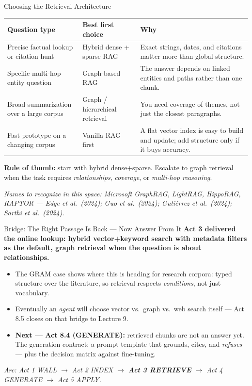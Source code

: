 \begin{frame}{Choosing the Retrieval Architecture}
\begin{center}
\renewcommand{\arraystretch}{1.15}
\small
\begin{tabular}{|p{3.2cm}|p{3.1cm}|p{5.8cm}|}
\hline
\textbf{Question type} & \textbf{Best first choice} & \textbf{Why} \\
\hline
Precise factual lookup or citation hunt & Hybrid dense + sparse RAG & Exact strings, dates, and citations matter more than global structure. \\
\hline
Specific multi-hop entity question & Graph-based RAG & The answer depends on linked entities and paths rather than one chunk. \\
\hline
Broad summarization over a large corpus & Graph / hierarchical retrieval & You need coverage of themes, not just the closest paragraphs. \\
\hline
Fast prototype on a changing corpus & Vanilla RAG first & A flat vector index is easy to build and update; add structure only if it buys accuracy. \\
\hline
\end{tabular}
\end{center}

\medskip
\textbf{Rule of thumb:} start with hybrid dense+sparse. Escalate to graph retrieval when the task requires \emph{relationships}, \emph{coverage}, or \emph{multi-hop reasoning}.

\smallskip
\textit{\footnotesize Names to recognize in this space: Microsoft GraphRAG, LightRAG, HippoRAG, RAPTOR --- Edge et al.\ (2024); Guo et al.\ (2024); Guti\'errez et al.\ (2024); Sarthi et al.\ (2024).}
\end{frame}

\begin{frame}{Bridge: The Right Passage Is Back --- Now Answer From It}
\textbf{Act 3 delivered the online lookup: hybrid vector+keyword search with metadata filters as the default, graph retrieval when the question is about relationships.}

\medskip
\begin{itemize}
\item The GRAM case shows where this is heading for research corpora: typed structure over the literature, so retrieval respects \emph{conditions}, not just vocabulary.

\medskip
\item Eventually an \emph{agent} will choose vector vs.\ graph vs.\ web search itself --- Act 8.5 closes on that bridge to Lecture 9.

\medskip
\item \textbf{Next --- Act 8.4 (GENERATE):} retrieved chunks are not an answer yet. The generation contract: a prompt template that grounds, cites, and \emph{refuses} --- plus the decision matrix against fine-tuning.
\end{itemize}

\bigskip
\centering
\footnotesize\textit{Arc: Act 1 WALL $\to$ Act 2 INDEX $\to$ \textbf{Act 3 RETRIEVE} $\to$ Act 4 GENERATE $\to$ Act 5 APPLY.}
\end{frame}


